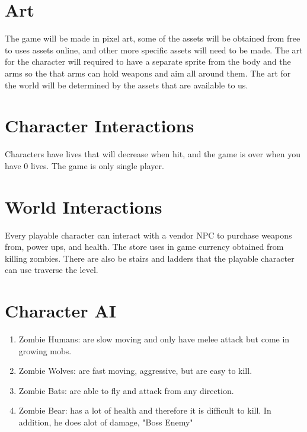\documentclass{article}
\begin{document}
\section{Art}
    The game will be made in pixel art, some of the assets will be obtained from free to uses assets online, and other more specific assets will need to be made.  The art for the character will required to have a separate sprite from the body and the arms so the that arms can hold weapons and aim all around them. The art for the world will be determined by the assets that are available to us. 


\section{Character Interactions}
Characters have lives that will decrease when hit, and the game is over when you have 0 lives. The game is only single player.


\section{World Interactions}

    Every playable character can interact with a vendor NPC to purchase weapons from, power ups, and health. The store uses in game currency obtained from killing zombies. There are also be stairs and ladders that the playable character can use traverse the level.

\section{Character AI}


\begin{enumerate}
  \item Zombie Humans: are slow moving and only have melee attack but come in growing mobs. 
  \item Zombie Wolves: are fast moving, aggressive, but are easy to kill.
  \item Zombie Bats: are able to fly and attack from any direction.
  \item Zombie Bear: has a lot of health and therefore it is difficult to kill. In addition, he does alot of damage, "Boss Enemy" 
\end{enumerate}
\end{document}
